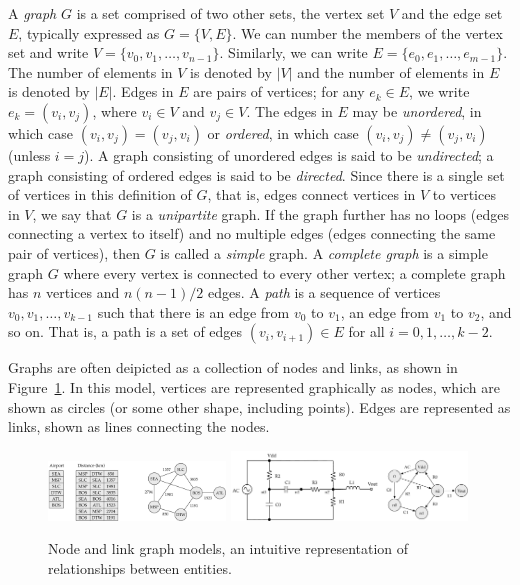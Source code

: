 A \emph{graph} $G$ is a set comprised of two other sets, the vertex set $V$ and the edge set $E$,
typically expressed as $G=\{V,E\}$. We can number the members of the vertex set
and write $V = \{ v_0, v_1, \ldots , v_{n-1} \}$. Similarly, we can write $E = \{ e_0, e_1, \ldots, e_{m-1} \}$. The number of elements in $V$ is denoted by $|V|$ and the number of elements in $E$ is denoted by $|E|$. Edges in $E$ are pairs of vertices; for any $e_k \in E$, we write $e_k = ( v_i, v_j )$, where $v_i \in V$ and $v_j\in V$. The edges in $E$ may be \emph{unordered}, in which case $(v_i, v_j) = (v_j, v_i)$ or \emph{ordered}, in which case $(v_i, v_j) \neq (v_j, v_i)$ (unless $i = j$).
A graph consisting of unordered edges is said to be \emph{undirected};
a graph consisting of ordered edges is said to be \emph{directed}.
Since there is a single set of vertices in this definition of $G$, that is, edges connect
vertices in $V$ to vertices in $V$, we say that
$G$ is a \emph{unipartite} graph.
If the graph further has no loops (edges connecting a vertex to itself)
and no multiple edges (edges connecting the same pair of vertices),
then $G$ is called a \emph{simple} graph.
A \emph{complete graph} is a simple graph $G$ where every vertex is connected
to every other vertex; a complete graph has
$n$ vertices and $n(n-1)/2$ edges.
A \emph{path} is a sequence of vertices $v_0, v_1, \ldots, v_{k-1}$ such that
there is an edge from $v_0$ to $v_1$, an edge from $v_1$ to $v_2$, and so on.
That is, a path is a set of edges $(v_i, v_{i+1}) \in E$ for all $i = 0, 1, \ldots, k-2$.

Graphs are often deipicted as a collection of nodes and links, as shown in
Figure~\ref{fig:node_link_graphs}. In this model, vertices are
represented graphically as nodes, which are
shown as circles (or some other shape, including points). Edges are represented as links,
shown as lines connecting the nodes.


\begin{figure}[ht]
  \begin{center}
    {\includegraphics[width=0.42\textwidth]{figs/airport.pdf}}
    {\includegraphics[width=0.56\textwidth]{figs/circuit.pdf}}
    \caption{Node and link graph models, an intuitive representation of relationships between entities.\label{fig:node_link_graphs}}
  \end{center}
\end{figure}

